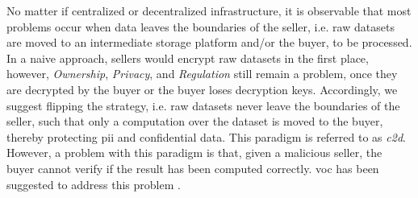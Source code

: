 

No matter if centralized or decentralized infrastructure, it is observable that most problems occur when data leaves the boundaries of the seller, i.e. raw datasets are moved to an intermediate storage platform and/or the buyer, to be processed. In a naive approach, sellers would encrypt raw datasets in the first place, however, \emph{Ownership}, \emph{Privacy}, and \emph{Regulation} still remain a problem, once they are decrypted by the buyer or the buyer loses decryption keys. Accordingly, we suggest flipping the strategy, i.e. raw datasets never leave the boundaries of the seller, such that only a computation over the dataset is moved to the buyer, thereby protecting \acrshort{pii} and confidential data. This paradigm is referred to as \emph{\acrfull{c2d}}. However, a problem with this paradigm is that, given a malicious seller, the buyer cannot verify if the result has been computed correctly. \acrfull{voc} has been suggested to address this problem \cite{eberhardtBlockchainInsightsOffChaining2017,eberhardtOffchainingModelsApproaches2018}.




